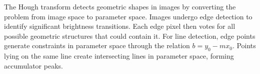 The Hough transform detects geometric shapes in images by converting the problem from image space to parameter space. Images undergo edge detection to identify significant brightness transitions. Each edge pixel then \QSOpen{}votes\QSClose{} for all possible geometric structures that could contain it. For line detection, edge points generate constraints in parameter space through the relation $b = y_0 - mx_0$. Points lying on the same line create intersecting lines in parameter space, forming accumulator peaks. 